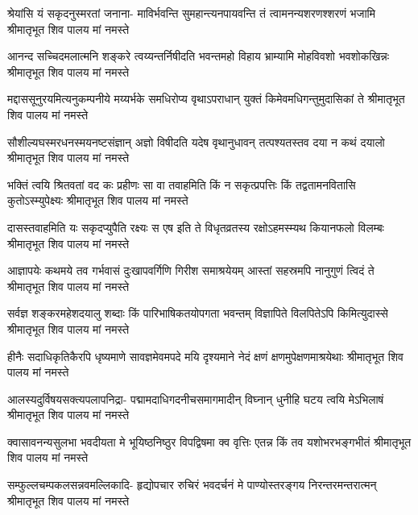 

\fourlineindentedshloka
{श्रेयांसि यं सकृदनुस्मरतां जनाना-}
{माविर्भवन्ति सुमहान्त्यनपायवन्ति}
{तं त्वामनन्यशरणश्शरणं भजामि}
{श्रीमातृभूत शिव पालय मां नमस्ते} %

\fourlineindentedshloka
{आनन्द सच्चिदमलात्मनि शङ्करे}
{त्वय्यन्तर्निषीदति भवन्तमहो विहाय}
{भ्राम्यामि मोहविवशो भवशोकखिन्नः}
{श्रीमातृभूत शिव पालय मां नमस्ते} %

\fourlineindentedshloka
{मद्दाससूनुरयमित्यनुकम्पनीये}
{मय्यर्भके समधिरोप्य वृथाऽपराधान्}
{युक्तं किमेवमधिगन्तुमुदासिकां ते}
{श्रीमातृभूत शिव पालय मां नमस्ते} %

\fourlineindentedshloka
{सौशील्यघस्मरधनस्मयनष्टसंज्ञान्}
{अज्ञो विषीदति यदेष वृथानुधावन्}
{तत्पश्यतस्तव दया न कथं दयालो}
{श्रीमातृभूत शिव पालय मां नमस्ते} %

\fourlineindentedshloka
{भक्तिं त्वयि श्रितवतां वद कः प्रहीणः}
{सा वा तवाहमिति किं न सकृत्प्रपत्तिः}
{किं तद्वतामनवितासि कुतोऽस्म्युपेक्ष्यः}
{श्रीमातृभूत शिव पालय मां नमस्ते} %

\fourlineindentedshloka
{दासस्तवाहमिति यः सकृदप्युपैति}
{रक्ष्यः स एष इति ते विधृतव्रतस्य}
{रक्षोऽहमस्म्यथ कियानफलो विलम्बः}
{श्रीमातृभूत शिव पालय मां नमस्ते} %

\fourlineindentedshloka
{आज्ञापयेः कथमये तव गर्भवासं}
{दुःखापवर्गिणि गिरीश समाश्रयेयम्}
{आस्तां सहस्रमपि नानुगुणं त्विदं ते}
{श्रीमातृभूत शिव पालय मां नमस्ते} %

\fourlineindentedshloka
{सर्वज्ञ शङ्करमहेशदयालु शब्दाः}
{किं पारिभाषिकतयोपगता भवन्तम्}
{विज्ञापिते विलपितेऽपि किमित्युदास्से}
{श्रीमातृभूत शिव पालय मां नमस्ते} %

\fourlineindentedshloka
{हीनैः सदाधिकृतिकैरपि धृष्यमाणे}
{सावज्ञमेवमपदे मयि दृश्यमाने}
{नेदं क्षणं क्षणमुपेक्षणमाश्रयेथाः}
{श्रीमातृभूत शिव पालय मां नमस्ते} %

\fourlineindentedshloka
{आलस्यदुर्विषयसक्त्यपलापनिद्रा-}
{पद्मामदाधिगदनीचसमागमादीन्}
{विघ्नान् धुनीहि घटय त्वयि मेऽभिलाषं}
{श्रीमातृभूत शिव पालय मां नमस्ते} %

\fourlineindentedshloka
{क्वासावनन्यसुलभा भवदीयता मे}
{भूयिष्ठनिष्ठुर विपद्विषमा क्व वृत्तिः}
{एतन्न किं तव यशोभरभङ्गभीतं}
{श्रीमातृभूत शिव पालय मां नमस्ते} %

\fourlineindentedshloka
{सम्फुल्लचम्पकलसन्नवमल्लिकादि-}
{हृद्योपचार रुचिरं भवदर्चनं मे}
{पाण्योस्तरङ्गय निरन्तरमन्तरात्मन्}
{श्रीमातृभूत शिव पालय मां नमस्ते} %


